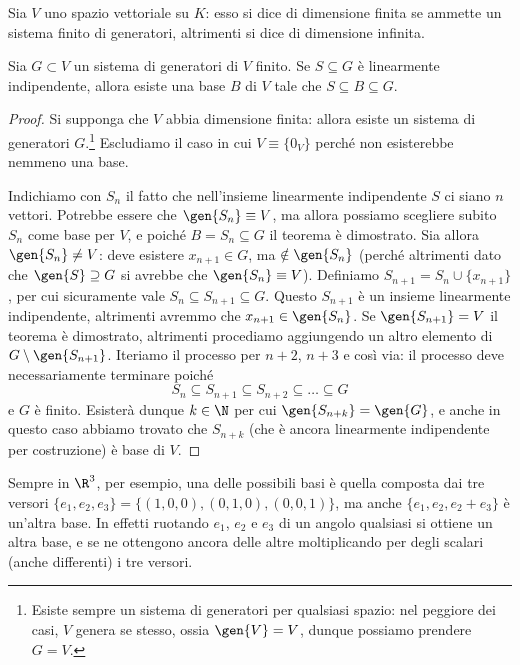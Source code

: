 \begin{definizione}
	Sia $V$ uno spazio vettoriale su $K$: esso si dice di dimensione finita se ammette un sistema finito di generatori, altrimenti si dice di dimensione infinita.
\end{definizione}
\begin{teorema} \label{t:esistenza-base}
	Sia $G\subset V$ un sistema di generatori di $V$ finito.
	Se $S\subseteq G$ è linearmente indipendente, allora esiste una base $B$ di $V$ tale che $S\subseteq B\subseteq G$.
\end{teorema}
\begin{proof}
	Si supponga che $V$ abbia dimensione finita: allora esiste un sistema di generatori $G$.\footnote{Esiste sempre un sistema di generatori per qualsiasi spazio: nel peggiore dei casi, $V$ genera se stesso, ossia $\gen{V}=V$, dunque possiamo prendere $G=V$.}
	Escludiamo il caso in cui $V\equiv\{0_V\}$ perché non esisterebbe nemmeno una base.

	Indichiamo con $S_n$ il fatto che nell'insieme linearmente indipendente $S$ ci siano $n$ vettori.
	Potrebbe essere che $\gen{S_n}\equiv V$, ma allora possiamo scegliere subito $S_n$ come base per $V$, e poiché $B=S_n\subseteq G$ il teorema è dimostrato.
	Sia allora $\gen{S_n}\ne V$: deve esistere $x_{n+1}\in G$, ma $\notin\gen{S_n}$ (perché altrimenti dato che $\gen{S}\supseteq G$ si avrebbe che $\gen{S_n}\equiv V$).
	Definiamo $S_{n+1}=S_n\cup\{x_{n+1}\}$, per cui sicuramente vale $S_n\subseteq S_{n+1}\subseteq G$.
	Questo $S_{n+1}$ è un insieme linearmente indipendente, altrimenti avremmo che $x_{n+1}\in\gen{S_n}$.
	Se $\gen{S_{n+1}}=V$ il teorema è dimostrato, altrimenti procediamo aggiungendo un altro elemento di $G\setminus\gen{S_{n+1}}$.
	Iteriamo il processo per $n+2$, $n+3$ e così via: il processo deve necessariamente terminare poich\'e
	\begin{equation*}
		S_n\subseteq S_{n+1}\subseteq S_{n+2}\subseteq\dots\subseteq G
	\end{equation*}
	e $G$ è finito.
	Esisterà dunque $k\in\N$ per cui $\gen{S_{n+k}}=\gen{G}$, e anche in questo caso abbiamo trovato che $S_{n+k}$ (che è ancora linearmente indipendente per costruzione) è base di $V$.
\end{proof}
Sempre in $\R^3$, per esempio, una delle possibili basi è quella composta dai tre versori $\{e_1,e_2,e_3\}=\{(1,0,0),(0,1,0),(0,0,1)\}$, ma anche $\{e_1,e_2,e_2+e_3\}$ è un'altra base.
In effetti ruotando $e_1$, $e_2$ e $e_3$ di un angolo qualsiasi si ottiene un altra base, e se ne ottengono ancora delle altre moltiplicando per degli scalari (anche differenti) i tre versori.
